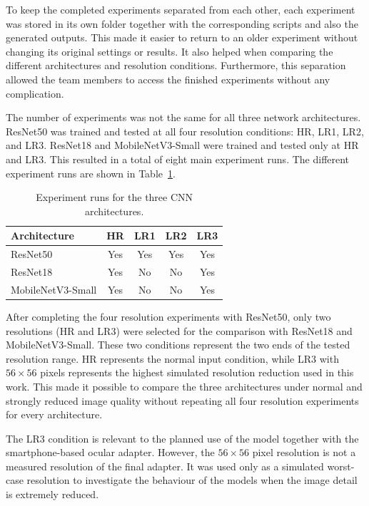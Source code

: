 To keep the completed experiments separated from each other, each experiment was stored in its own folder together with the corresponding scripts and also the generated outputs. This made it easier to return to an older experiment without changing its original settings or results. It also helped when comparing the different architectures and resolution conditions. Furthermore, this separation allowed the team members to access the finished experiments without any complication.

The number of experiments was not the same for all three network architectures. ResNet50 was trained and tested at all four resolution conditions: HR, LR1, LR2, and LR3. ResNet18 and MobileNetV3-Small were trained and tested only at HR and LR3. This resulted in a total of eight main experiment runs. The different experiment runs are shown in Table~\ref{tab:experiment_coverage}.

\begin{table}[htbp]
    \centering
    \caption{Experiment runs for the three CNN architectures.}
    \label{tab:experiment_coverage}
    \begin{tabular}{|l|c|c|c|c|}
        \hline
        \textbf{Architecture} & \textbf{HR} & \textbf{LR1} & \textbf{LR2} & \textbf{LR3} \\ \hline
        ResNet50 & Yes & Yes & Yes & Yes \\ \hline
        ResNet18 & Yes & No & No & Yes \\ \hline
        MobileNetV3-Small & Yes & No & No & Yes \\ \hline
    \end{tabular}
\end{table}

\FloatBarrier

After completing the four resolution experiments with ResNet50, only two resolutions (HR and LR3) were selected for the comparison with ResNet18 and MobileNetV3-Small. These two conditions represent the two ends of the tested resolution range. HR represents the normal input condition, while LR3 with \(56 \times 56\) pixels represents the highest simulated resolution reduction used in this work. This made it possible to compare the three architectures under normal and strongly reduced image quality without repeating all four resolution experiments for every architecture.

The LR3 condition is relevant to the planned use of the model together with the smartphone-based ocular adapter. However, the \(56 \times 56\) pixel resolution is not a measured resolution of the final adapter. It was used only as a simulated worst-case resolution to investigate the behaviour of the models when the image detail is extremely reduced. 

